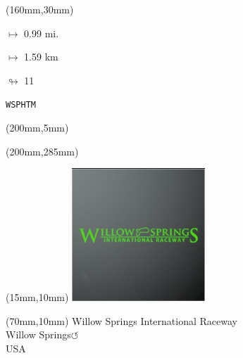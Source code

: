 \begin{textblock*}{40mm}(160mm,30mm)%
\Large
\par$\mapsto$ 0.99 mi.
\par$\mapsto$ 1.59 km
\par$\looparrowright$ 11
\par\hfill\tiny\tt WSPHTM\\
\end{textblock*}
\begin{textblock*}{20mm}(200mm,5mm)%
\fbox{\thepage}
\label{WSPHTM}
\end{textblock*}
\begin{textblock*}{20mm}(200mm,285mm)%
\fbox{\thepage}
\end{textblock*}

\null\newpage
\begin{textblock*}{50mm}(15mm,10mm)%
\includegraphics[width=50mm]{LG/2015-05-20_00098.png}
\end{textblock*}
\begin{textblock*}{130mm}(70mm,10mm)%
{\fontsize{20}{20}\selectfont Willow Springs International Raceway\\}
{\fontsize{16}{16}\selectfont Willow Springs\hfill \huge$\circlearrowleft$\\}
{\fontsize{12}{12}\selectfont USA\\}
\end{textblock*}
